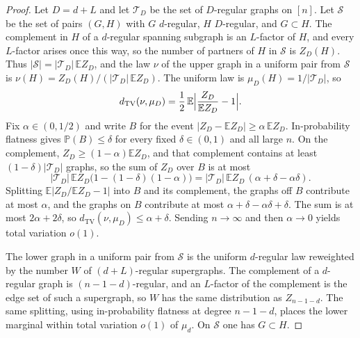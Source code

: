\documentclass[11pt]{article}
\newcommand{\EE}{\mathbb{E}}
\newcommand{\PP}{\mathbb{P}}
\newcommand{\dTV}{d_{\mathrm{TV}}}
\begin{document}
\begin{proof}
Let \(D=d+L\) and let \(\mathcal T_D\) be the set of \(D\)-regular graphs on \([n]\).
Let \(\mathcal S\) be the set of pairs \((G,H)\) with \(G\) \(d\)-regular,
\(H\) \(D\)-regular, and \(G\subset H\).
The complement in \(H\) of a \(d\)-regular spanning subgraph is an \(L\)-factor of
\(H\), and every \(L\)-factor arises once this way, so the number of partners of
\(H\) in \(\mathcal S\) is \(Z_D(H)\).
Thus \(|\mathcal S|=|\mathcal T_D|\,\EE Z_D\), and the law \(\nu\) of the upper graph in a
uniform pair from \(\mathcal S\) is \(\nu(H)=Z_D(H)/(|\mathcal T_D|\,\EE Z_D)\).
The uniform law is \(\mu_D(H)=1/|\mathcal T_D|\), so
\[
\dTV(\nu,\mu_D)
=
\frac12\,\EE\Bigl|\frac{Z_D}{\EE Z_D}-1\Bigr|.
\]
Fix \(\alpha\in(0,1/2)\) and write \(B\) for the event
\(|Z_D-\EE Z_D|\ge\alpha\,\EE Z_D\).
In-probability flatness gives \(\PP(B)\le\delta\) for every fixed \(\delta\in(0,1)\)
and all large \(n\).
On the complement, \(Z_D\ge(1-\alpha)\EE Z_D\), and that complement contains at
least \((1-\delta)|\mathcal T_D|\) graphs, so the sum of \(Z_D\) over \(B\) is at most
\[
|\mathcal T_D|\,\EE Z_D\bigl(1-(1-\delta)(1-\alpha)\bigr)
=
|\mathcal T_D|\,\EE Z_D\,(\alpha+\delta-\alpha\delta).
\]
Splitting \(\EE|Z_D/\EE Z_D-1|\) into \(B\) and its complement, the graphs off
\(B\) contribute at most \(\alpha\), and the graphs on \(B\) contribute at most
\(\alpha+\delta-\alpha\delta+\delta\).
The sum is at most \(2\alpha+2\delta\), so
\(\dTV(\nu,\mu_D)\le\alpha+\delta\).
Sending \(n\to\infty\) and then \(\alpha\to 0\) yields total variation \(o(1)\).

The lower graph in a uniform pair from \(\mathcal S\) is the uniform \(d\)-regular
law reweighted by the number \(W\) of \((d+L)\)-regular supergraphs.
The complement of a \(d\)-regular graph is \((n-1-d)\)-regular, and an
\(L\)-factor of the complement is the edge set of such a supergraph, so \(W\) has
the same distribution as \(Z_{n-1-d}\).
The same splitting, using in-probability flatness at degree \(n-1-d\), places
the lower marginal within total variation \(o(1)\) of \(\mu_d\).
On \(\mathcal S\) one has \(G\subset H\).
\end{proof}
\end{document}
